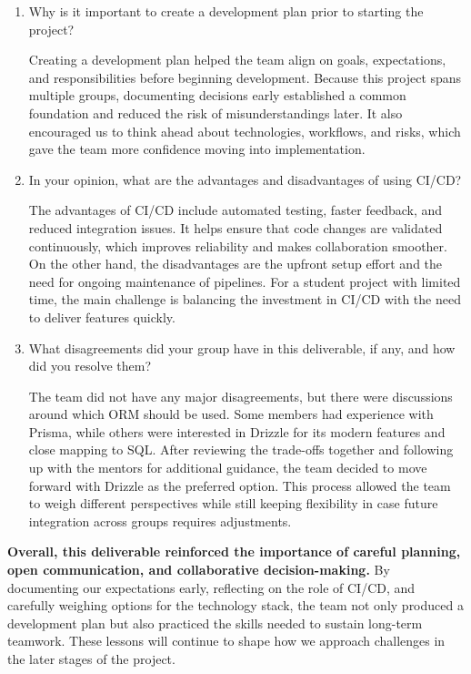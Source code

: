 \documentclass{article}
\begin{document}
\begin{enumerate}
    \item Why is it important to create a development plan prior to starting the
    project?

    Creating a development plan helped the team align on goals, expectations, and responsibilities before beginning development. Because this project spans multiple groups, documenting decisions early established a common foundation and reduced the risk of misunderstandings later. It also encouraged us to think ahead about technologies, workflows, and risks, which gave the team more confidence moving into implementation.
    
    \item In your opinion, what are the advantages and disadvantages of using
    CI/CD?

    The advantages of CI/CD include automated testing, faster feedback, and reduced integration issues. It helps ensure that code changes are validated continuously, which improves reliability and makes collaboration smoother. On the other hand, the disadvantages are the upfront setup effort and the need for ongoing maintenance of pipelines. For a student project with limited time, the main challenge is balancing the investment in CI/CD with the need to deliver features quickly.
    
    \item What disagreements did your group have in this deliverable, if any,
    and how did you resolve them?
   
    The team did not have any major disagreements, but there were discussions around which ORM should be used. Some members had experience with Prisma, while others were interested in Drizzle for its modern features and close mapping to SQL. After reviewing the trade-offs together and following up with the mentors for additional guidance, the team decided to move forward with Drizzle as the preferred option. This process allowed the team to weigh different perspectives while still keeping flexibility in case future integration across groups requires adjustments.
\end{enumerate}

\noindent
\textbf{Overall, this deliverable reinforced the importance of careful planning, open communication, and collaborative decision-making.} By documenting our expectations early, reflecting on the role of CI/CD, and carefully weighing options for the technology stack, the team not only produced a development plan but also practiced the skills needed to sustain long-term teamwork. These lessons will continue to shape how we approach challenges in the later stages of the project.
\end{document}
